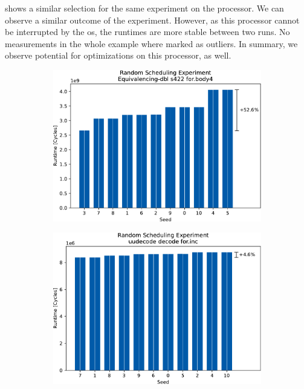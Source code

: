  shows a similar selection for the same experiment on the \aurora{} processor.
We can observe a similar outcome of the experiment.
However, as this processor cannot be interrupted by the \ac{os}, the runtimes are more stable between two runs.
No measurements in the whole example where marked as outliers.
In summary, we observe potential for optimizations on this processor, as well.
\begin{figure}
    \begin{subfigure}{0.0325\textwidth}\caption{}\label{fig:eval:rndm:aurora:a}\end{subfigure}
    \begin{subfigure}{0.44\textwidth}
        \includegraphics[width=\textwidth]{img/random-scheduling-experiment-aurora-collected/Equivalencing-dbl-crop.pdf}
    \end{subfigure}
    \hfill
    \begin{subfigure}{0.0325\textwidth}\caption{}\label{fig:eval:rndm:aurora:b}\end{subfigure}
    \begin{subfigure}{0.44\textwidth}
        \includegraphics[width=\textwidth]{img/random-scheduling-experiment-aurora-collected/uudecode-crop.pdf}
    \end{subfigure}


\end{figure}
